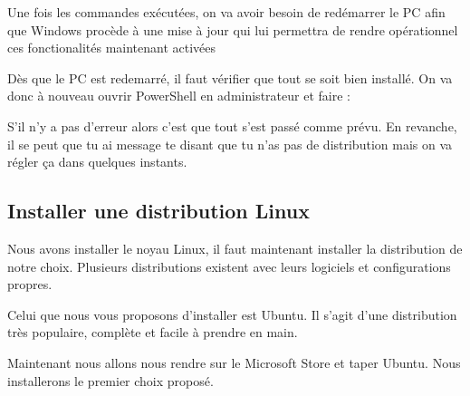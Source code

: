 \documentclass[a4paper, 12pt]{article}
\begin{document}
{    

    \vspace{1cm}

    Une fois les commandes exécutées, on va avoir besoin de redémarrer le PC afin que Windows
    procède à une mise à jour qui lui permettra de rendre opérationnel ces fonctionalités maintenant activées
    \newline

    Dès que le PC est redemarré, il faut vérifier que tout se soit bien installé.
    On va donc à nouveau ouvrir PowerShell en administrateur et faire :
    \vspace{0.5cm}
    \vspace{0.5cm}
    
    S'il n'y a pas d'erreur alors c'est que tout s'est passé comme prévu.
    En revanche, il se peut que tu ai message te disant que tu n'as pas de distribution
    mais on va régler ça dans quelques instants.
    \vspace{5cm}

    \subsection{Installer une distribution Linux}
    
    Nous avons installer le noyau Linux, il faut maintenant installer la distribution de notre choix.
    Plusieurs distributions existent avec leurs logiciels et configurations propres.


    Celui que nous vous proposons d'installer est Ubuntu. Il s'agit d'une distribution
    très populaire, complète et facile à prendre en main.


    Maintenant nous allons nous rendre sur le Microsoft Store et taper Ubuntu.
    Nous installerons le premier choix proposé.

}
\end{document}
